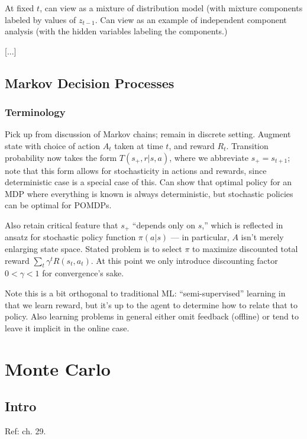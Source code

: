 \documentclass[notitlepage,openany,11pt]{report}
\theoremstyle{plain}%
\numberwithin{equation}{section}
\begin{document}
At fixed $t$, can view as a mixture of distribution model (with mixture components labeled by values of $z_{t-1}$. Can view as an example of independent component analysis (with the hidden variables labeling the components.) 



[...]


\subsection{Markov Decision Processes} 

\subsubsection{Terminology} Pick up from discussion of Markov chains; remain in discrete setting. Augment state with choice of action $A_{t}$ taken at time $t$, and reward $R_{t}$. Transition probability now takes the form $T(s_{+}, r | s, a)$, where we abbreviate $s_{+} = s_{t+1}$; note that this form allows for stochasticity in actions and rewards, since deterministic case is a special case of this. Can show that optimal policy for an MDP where everything is known is always deterministic, but stochastic policies can be optimal for POMDPs. 

Also retain critical feature that $s_{+}$ ``depends only on $s$,''  which is reflected in ansatz for stochastic policy function $\pi(a|s)$ --- in particular, $A$ isn't merely enlarging state space. Stated problem is to select $\pi$ to maximize discounted total reward $\sum_{t} \gamma^{t} R(s_{t}, a_{t})$. At this point we only introduce discounting factor $0 < \gamma < 1$ for convergence's sake.

Note this is a bit orthogonal to traditional ML: ``semi-supervised'' learning in that we learn reward, but it's up to the agent to determine how to relate that to policy. Also learning problems in general either omit feedback (offline) or tend to leave it implicit in the online case.

\section{Monte Carlo} 

\subsection{Intro} Ref: \cite{MacKay:03} ch. 29.
\end{document}
